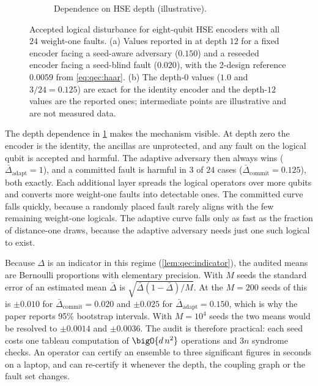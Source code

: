 \begin{figure}[htbp]
\begin{subfigure}[t]{0.48\textwidth}
\caption{Dependence on HSE depth (illustrative).}
\label{fig:qec:disturbance-depth}
\end{subfigure}
\caption{Accepted logical disturbance for eight-qubit HSE encoders with all $24$ weight-one faults. (a) Values reported in \cite{guo2026qecaudit} at depth $12$ for a fixed encoder facing a seed-aware adversary ($0.150$) and a reseeded encoder facing a seed-blind fault ($0.020$), with the 2-design reference $0.0059$ from \cref{eq:qec:haar}. (b) The depth-$0$ values ($1.0$ and $3/24=0.125$) are exact for the identity encoder and the depth-$12$ values are the reported ones; intermediate points are illustrative and are not measured data.}
\label{fig:qec:disturbance}
\end{figure}

The depth dependence in \cref{fig:qec:disturbance-depth} makes the mechanism visible. At depth zero the encoder is the identity, the ancillas are unprotected, and any fault on the logical qubit is accepted and harmful. The adaptive adversary then always wins ($\bar\Delta_{\mathrm{adapt}}=1$), and a committed fault is harmful in $3$ of $24$ cases ($\bar\Delta_{\mathrm{commit}}=0.125$), both exactly. Each additional layer spreads the logical operators over more qubits and converts more weight-one faults into detectable ones. The committed curve falls quickly, because a randomly placed fault rarely aligns with the few remaining weight-one logicals. The adaptive curve falls only as fast as the fraction of distance-one draws, because the adaptive adversary needs just one such logical to exist.

Because $\Delta$ is an indicator in this regime (\cref{lem:qec:indicator}), the audited means are Bernoulli proportions with elementary precision. With $M$ seeds the standard error of an estimated mean $\bar\Delta$ is $\sqrt{\bar\Delta(1-\bar\Delta)/M}$. At the $M=200$ seeds of \cite{guo2026qecaudit} this is $\pm0.010$ for $\bar\Delta_{\mathrm{commit}}=0.020$ and $\pm0.025$ for $\bar\Delta_{\mathrm{adapt}}=0.150$, which is why the paper reports 95\% bootstrap intervals. With $M=10^{4}$ seeds the two means would be resolved to $\pm0.0014$ and $\pm0.0036$. The audit is therefore practical: each seed costs one tableau computation of $\bigO{d\,n^{2}}$ operations and $3n$ syndrome checks. An operator can certify an ensemble to three significant figures in seconds on a laptop, and can re-certify it whenever the depth, the coupling graph or the fault set changes.

